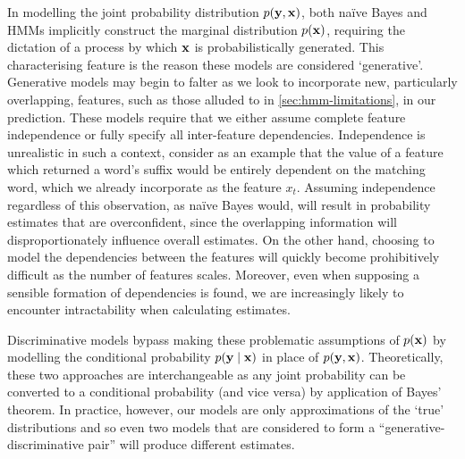 \documentclass[../main.tex]{subfiles}
\begin{document}


In modelling the joint probability distribution $p(\mathbf{y},\mathbf{x})$, both na{\"i}ve Bayes and HMMs implicitly construct the marginal distribution $p(\mathbf{x})$, requiring the dictation of a process by which $\mathbf{x}$ is probabilistically generated. This characterising feature is the reason these models are considered `generative'.
Generative models may begin to falter as we look to incorporate new, particularly overlapping, features, such as those alluded to in \cref{sec:hmm-limitations}, in our prediction.
These models require that we either assume complete feature independence or fully specify all inter-feature dependencies.
Independence is unrealistic in such a context, consider as an example that the value of a feature which returned a word's suffix would be entirely dependent on the matching word, which we already incorporate as the feature $x_t$.
Assuming independence regardless of this observation, as na{\"i}ve Bayes would, will result in probability estimates that are overconfident, since the overlapping information will disproportionately influence overall estimates.
On the other hand, choosing to model the dependencies between the features will quickly become prohibitively difficult as the number of features scales.
Moreover, even when supposing a sensible formation of dependencies is found, we are increasingly likely to encounter intractability when calculating estimates.

Discriminative models bypass making these problematic assumptions of $p(\mathbf{x})$ by modelling the conditional probability $p(\mathbf{y} \mid \mathbf{x})$ in place of $p(\mathbf{y},\mathbf{x})$.
Theoretically, these two approaches are interchangeable as any joint probability can be converted to a conditional probability (and vice versa) by application of Bayes' theorem.
In practice, however, our models are only approximations of the `true' distributions and so even two models that are considered to form a ``generative-discriminative pair'' \autocite{andrew-generative-discriminative-2001} will produce different estimates.
\end{document}
